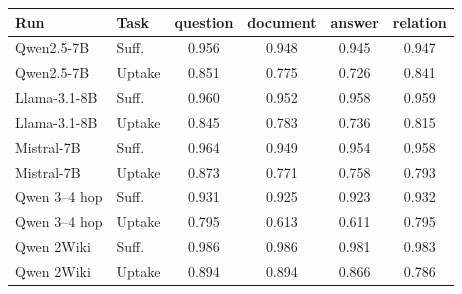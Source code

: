 \begin{tabular}{llcccc}
\toprule
Run & Task & question & document & answer & relation \\
\midrule
Qwen2.5-7B & Suff. & 0.956 & 0.948 & 0.945 & 0.947 \\
Qwen2.5-7B & Uptake & 0.851 & 0.775 & 0.726 & 0.841 \\
Llama-3.1-8B & Suff. & 0.960 & 0.952 & 0.958 & 0.959 \\
Llama-3.1-8B & Uptake & 0.845 & 0.783 & 0.736 & 0.815 \\
Mistral-7B & Suff. & 0.964 & 0.949 & 0.954 & 0.958 \\
Mistral-7B & Uptake & 0.873 & 0.771 & 0.758 & 0.793 \\
Qwen 3--4 hop & Suff. & 0.931 & 0.925 & 0.923 & 0.932 \\
Qwen 3--4 hop & Uptake & 0.795 & 0.613 & 0.611 & 0.795 \\
Qwen 2Wiki & Suff. & 0.986 & 0.986 & 0.981 & 0.983 \\
Qwen 2Wiki & Uptake & 0.894 & 0.894 & 0.866 & 0.786 \\
\bottomrule
\end{tabular}